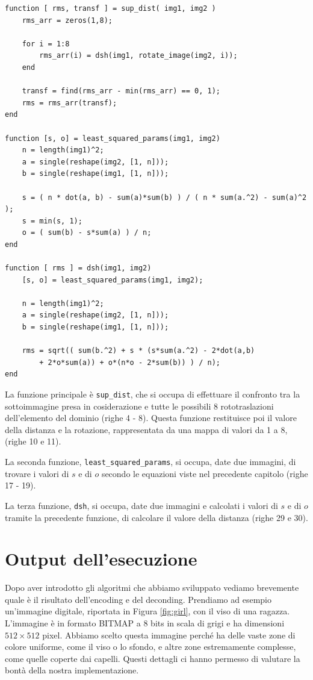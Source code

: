 \documentclass[11pt,a4paper,appendixprefix=true,numbers=noenddot]{scrreprt}
\begin{document}
\begin{verbatim}
function [ rms, transf ] = sup_dist( img1, img2 )
    rms_arr = zeros(1,8);

    for i = 1:8
        rms_arr(i) = dsh(img1, rotate_image(img2, i));
    end

    transf = find(rms_arr - min(rms_arr) == 0, 1);
    rms = rms_arr(transf);
end

function [s, o] = least_squared_params(img1, img2)
    n = length(img1)^2;
    a = single(reshape(img2, [1, n]));
    b = single(reshape(img1, [1, n]));

    s = ( n * dot(a, b) - sum(a)*sum(b) ) / ( n * sum(a.^2) - sum(a)^2 );
    s = min(s, 1);
    o = ( sum(b) - s*sum(a) ) / n;
end

function [ rms ] = dsh(img1, img2)
    [s, o] = least_squared_params(img1, img2);

    n = length(img1)^2;
    a = single(reshape(img2, [1, n]));
    b = single(reshape(img1, [1, n]));

    rms = sqrt(( sum(b.^2) + s * (s*sum(a.^2) - 2*dot(a,b) 
        + 2*o*sum(a)) + o*(n*o - 2*sum(b)) ) / n);
end
\end{verbatim}

La funzione principale è \texttt{sup\_dist}, che si occupa di effettuare il confronto tra la sottoimmagine presa in cosiderazione e tutte le possibili 8 rototraslazioni dell'elemento del dominio (righe 4 - 8). Questa funzione restituisce poi il valore della distanza e la rotazione, rappresentata da una mappa di valori da 1 a 8, (righe 10 e 11).

La seconda funzione, \texttt{least\_squared\_params}, si occupa, date due immagini, di trovare i valori di $s$ e di $o$ secondo le equazioni viste nel precedente capitolo (righe 17 - 19).

La terza funzione, \texttt{dsh}, si occupa, date due immagini e calcolati i valori di $s$ e di $o$ tramite la precedente funzione, di calcolare il valore della distanza (righe 29 e 30).

\section{Output dell'esecuzione}

Dopo aver introdotto gli algoritmi che abbiamo sviluppato vediamo brevemente quale è il risultato dell'encoding e del deconding. Prendiamo ad esempio un'immagine digitale, riportata in Figura \ref{fig:girl}, con il viso di una ragazza. L'immagine è in formato BITMAP a 8 bits in scala di grigi e ha dimensioni $512 \times 512$ pixel. Abbiamo scelto questa immagine perché ha delle vaste zone di colore uniforme, come il viso o lo sfondo, e altre zone estremamente complesse, come quelle coperte dai capelli. Questi dettagli ci hanno permesso di valutare la bontà della nostra implementazione.
\end{document}
